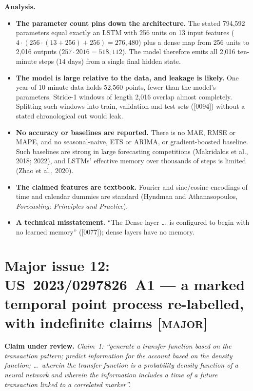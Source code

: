 \documentclass[10pt,a4paper]{article}
\newcommand{\claim}[1]{\noindent\textbf{Claim under review.} \emph{#1}\par\smallskip}
\newcommand{\sev}[1]{\textsc{\color{BrickRed}[#1]}}
\begin{document}
\noindent\textbf{Analysis.}
\begin{itemize}
  \item \textbf{The parameter count pins down the architecture.} The stated 794,592 parameters equal exactly an LSTM with 256 units on 13 input features ($4\cdot(256\cdot(13+256)+256)=276{,}480$) plus a dense map from 256 units to 2,016 outputs ($257\cdot2016=518{,}112$). The model therefore emits all 2,016 ten-minute steps (14 days) from a single final hidden state.
  \item \textbf{The model is large relative to the data, and leakage is likely.} One year of 10-minute data holds 52,560 points, fewer than the model's parameters. Stride-1 windows of length 2,016 overlap almost completely. Splitting such windows into train, validation and test sets ([0094]) without a stated chronological cut would leak.
  \item \textbf{No accuracy or baselines are reported.} There is no MAE, RMSE or MAPE, and no seasonal-naive, ETS or ARIMA, or gradient-boosted baseline. Such baselines are strong in large forecasting competitions (Makridakis et al., 2018; 2022), and LSTMs' effective memory over thousands of steps is limited (Zhao et al., 2020).
  \item \textbf{The claimed features are textbook.} Fourier and sine/cosine encodings of time and calendar dummies are standard (Hyndman and Athanasopoulos, \emph{Forecasting: Principles and Practice}).
  \item \textbf{A technical misstatement.} ``The Dense layer \ldots\ is configured to begin with no learned memory'' ([0077]); dense layers have no memory.
\end{itemize}

\section{Major issue 12: US~2023/0297826~A1 --- a marked temporal point process re-labelled, with indefinite claims \sev{major}}\label{sec:tpp}
\claim{Claim~1: ``generate a transfer function based on the transaction pattern; predict information for the account based on the density function; \ldots\ wherein the transfer function is a probability density function of a neural network and wherein the information includes a time of a future transaction linked to a correlated marker''.}
\end{document}
